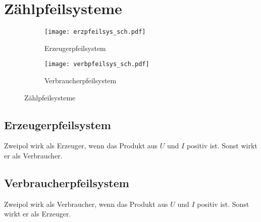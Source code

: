 



\section{Zählpfeilsysteme}

\begin{figure}[h!]
	\centering
	\begin{subfigure}[b]{0.4\textwidth}
		\centering
		\texttt{[image: erzpfeilsys\_sch.pdf]}
		\caption{Erzeugerpfeilsystem}
		\label{sch:erzpfeilsys}
	\end{subfigure}
	\begin{subfigure}[b]{0.4\textwidth}
		\centering
		\texttt{[image: verbpfeilsys\_sch.pdf]}
		\caption{Verbraucherpfeilsystem}
		\label{sch:verbpfeilsys}
	\end{subfigure}
	\caption{Zählpfeilsysteme}
	\label{sch:pfeilsys}
\end{figure}

\subsection{Erzeugerpfeilsystem}
Zweipol wirk als Erzeuger, wenn das Produkt aus $U$ und $I$ positiv ist. Sonst wirkt er als Verbraucher. 

\subsection{Verbraucherpfeilsystem}
Zweipol wirk als Verbraucher, wenn das Produkt aus $U$ und $I$ positiv ist. Sonst wirkt er als Erzeuger. 
